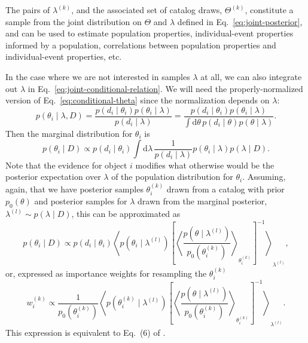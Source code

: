 \documentclass[modern]{aastex63}
\newcommand{\dd}{\ensuremath{\mathrm{d}}}
\begin{document}
The pairs of $\lambda^{(k)}$, and the associated set of catalog draws,
$\Theta^{(k)}$, constitute a sample from the joint distribution on $\Theta$ and
$\lambda$ defined in Eq.\ \eqref{eq:joint-posterior}, and can be used to
estimate population properties, individual-event properties informed by a
population, correlations between population properties and individual-event
properties, etc.

In the case where we are not interested in samples $\lambda$ at all, we can also
integrate out $\lambda$ in Eq.\ \eqref{eq:joint-conditional-relation}.  We will
need the properly-normalized version of Eq.\ \eqref{eq:conditional-theta} since
the normalization depends on $\lambda$:
%
\begin{equation}
  p\left( \theta_i \mid \lambda, D \right) = \frac{p\left( d_i \mid \theta_i \right) p\left( \theta_i \mid \lambda\right)}{p\left( d_i \mid \lambda \right)} = \frac{p\left( d_i \mid \theta_i \right) p\left( \theta_i \mid \lambda\right)}{\int \dd \theta \, p\left( d_i \mid \theta\right) p\left( \theta \mid \lambda \right)}.
\end{equation}
%
Then the marginal distribution for $\theta_i$ is
%
\begin{equation}
  p\left( \theta_i \mid D \right) \propto p\left( d_i \mid \theta_i \right) \int \dd \lambda \, \frac{1}{p\left( d_i \mid \lambda \right)} p\left( \theta_i \mid \lambda \right) p\left( \lambda \mid D \right).
\end{equation}
%
Note that the evidence for object $i$ modifies what otherwise would be the
posterior expectation over $\lambda$ of the population distribution for
$\theta_i$.   Assuming, again, that we have posterior samples $\theta_i^{(k)}$
drawn from a catalog with prior $p_0\left(\theta \right)$ and posterior samples
for $\lambda$ drawn from the marginal posterior, $\lambda^{(l)} \sim p\left(
\lambda \mid D \right)$, this can be approximated as
%
\begin{equation}
  p\left( \theta_i \mid D \right) \propto p\left( d_i \mid \theta_i \right) \left\langle p\left( \theta_i \mid \lambda^{(l)} \right) \left[\left\langle \frac{p\left( \theta \mid \lambda^{(l)} \right)}{p_0 \left( \theta_i^{(k)} \right)} \right\rangle_{\theta_i^{(k)}} \right]^{-1} \right\rangle_{\lambda^{(l)}},
\end{equation}
%
or, expressed as importance weights for resampling the $\theta^{(k)}_i$
%
\begin{equation}
  w_i^{(k)} \propto \frac{1}{p_0\left( \theta_i^{(k)} \right)} \left\langle p\left( \theta_i^{(k)} \mid \lambda^{(l)} \right) \left[\left\langle \frac{p\left( \theta \mid \lambda^{(l)} \right)}{p_0 \left( \theta_i^{(k)} \right)} \right\rangle_{\theta_i^{(k)}} \right]^{-1} \right\rangle_{\lambda^{(l)}}.
\end{equation}
%
This expression is equivalent to Eq.\ (6) of \citet{Callister2019}.


\end{document}
